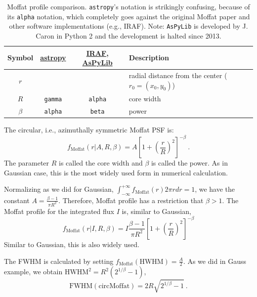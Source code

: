 \begin{table}
\label{tab: Moffat}
\caption{Moffat profile comparison. \texttt{astropy}'s notation is strikingly confusing, because of its \texttt{alpha} notation, which completely goes against the original Moffat paper and other software implementations (e.g., IRAF). Note: \texttt{AsPyLib} is developed by J. Caron in Python 2 and the development is halted since 2013.}
\centering
\begin{tabular}{cccl}
  \hline
  Symbol &
  \href{http://docs.astropy.org/en/stable/api/astropy.modeling.functional_models.Moffat2D.html\#astropy.modeling.functional_models.Moffat2D}{astropy} & 
  \href{http://stsdas.stsci.edu/cgi-bin/gethelp.cgi?psfmeasure}{IRAF}, \href{http://www.aspylib.com/doc/aspylib_fitting.html}{AsPyLib} & 
  Description \\
  \hline
  $ r $ & & & radial distance from the center ($ r_0 = (x_0, y_0) $) \\
  $ R $ & \texttt{gamma} & \texttt{alpha} & core width \\
  $ \beta $& \texttt{alpha} & \texttt{beta} & power \\
  \hline
\end{tabular}
\end{table}

The circular, i.e., azimuthally symmetric Moffat PSF is:
\begin{equation}\label{eq: profile moffat}
  f_\mathrm{Moffat} (r|A, R, \beta) = A \left [ 1 + \left ( \frac{r}{R} \right )^2 \right ]^{-\beta} ~.
\end{equation}
The parameter $R$ is called the core width and $\beta$ is called the power. As in Gaussian case, this is the most widely used form in numerical calculation.

Normalizing as we did for Gaussian, $ \int_{-\infty}^{+\infty} f_\mathrm{Moffat}(r) 2\pi r dr = 1 $, we have the constant $ A = \frac{\beta - 1}{\pi R^2} $. Therefore, Moffat profile has a restriction that $ \beta > 1 $. The Moffat profile for the integrated flux $ I $ is, similar to Gaussian,
\begin{equation}\label{eq: profile moffat flux}
  f_\mathrm{Moffat}(r|I, R, \beta) = I \frac{\beta - 1}{\pi R^2} \left [ 1 + \left ( \frac{r}{R} \right )^2 \right ]^{-\beta}
\end{equation} 
Similar to Gaussian, this is also widely used.

The FWHM is calculated by setting $f_\mathrm{Moffat}(\mathrm{HWHM}) = \frac{A}{2}$. As we did in Gauss example, we obtain $ \mathrm{HWHM}^2 = R^2 (2^{1/\beta}-1) $,
\begin{equation}\label{eq: FWHM moffat}
  \mathrm{FWHM}(\mathrm{circMoffat}) = 2 R \sqrt{2^{1/\beta}-1} ~.
\end{equation}

